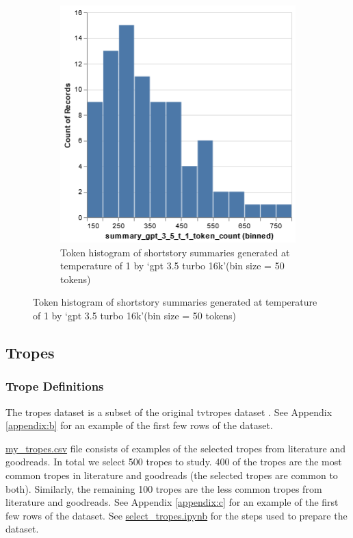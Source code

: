 \documentclass[11pt]{article}
\begin{document}
\begin{figure}[h]
\begin{subfigure}[t]{.95\textwidth}
  \includegraphics[scale=0.5]{summary2_tokens.png}
  \caption{Token histogram of shortstory summaries generated at temperature of 1 by `gpt 3.5 turbo 16k'(bin size = 50 tokens)}
\end{subfigure}
\end{figure}

\subsection{Tropes}
\subsubsection{Trope Definitions}
The tropes dataset is a subset of the original tvtropes dataset \cite{gala-etal-2020-analyzing}. See Appendix \ref{appendix:b} for an example of the first few rows of the dataset.

\href{https://github.com/armsp/trama/blob/main/dataset/my_tropes.csv}{my\_tropes.csv} file consists of examples of the selected tropes from literature and goodreads. In total we select 500 tropes to study. 400 of the tropes are the most common tropes in literature and goodreads (the selected tropes are common to both). Similarly, the remaining 100 tropes are the less common tropes from literature and goodreads. See Appendix \ref{appendix:c} for an example of the first few rows of the dataset. See \href{https://github.com/armsp/trama/blob/main/select%20tropes.ipynb}{select\_tropes.ipynb} for the steps used to prepare the dataset.
\end{document}
